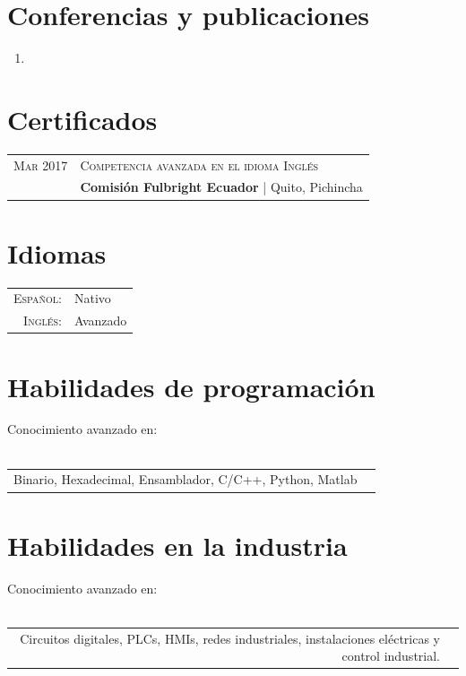 \documentclass[a4paper,10.9pt]{article}
\begin{document}
\section{Conferencias y publicaciones}
\begin{enumerate}
	\item {}
\end{enumerate}
	



\section{Certificados}
\begin{tabular}{r|l}	
 \textsc{Mar} 2017 &  \textsc{Competencia avanzada en el idioma Inglés}\\&
 \textbf{Comisión Fulbright Ecuador} | Quito, Pichincha\\

\end{tabular}

\section{Idiomas}
\begin{tabular}{rl}
 \textsc{Español:}&Nativo\\
\textsc{Inglés:}&Avanzado\\
\end{tabular}

\section{Habilidades de programación}
Conocimiento avanzado en:\\
\\
\begin{tabular}{rl}

Binario, Hexadecimal, Ensamblador, C/C++, Python, Matlab\\


\end{tabular}

\section{Habilidades en la industria}
Conocimiento avanzado en:\\
\\
\begin{tabular}{rl}
Circuitos digitales, PLCs, HMIs, redes industriales, instalaciones eléctricas y control industrial.\\
\end{tabular}
\end{document}
